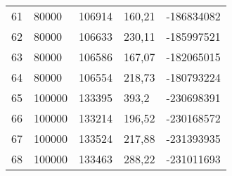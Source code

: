 \begin{longtable}{lllll}
    61               & 80000          & 106914         & 160,21     & -186834082      \\
    62               & 80000          & 106633         & 230,11     & -185997521      \\
    63               & 80000          & 106586         & 167,07     & -182065015      \\
    64               & 80000          & 106554         & 218,73     & -180793224      \\
    65               & 100000         & 133395         & 393,2     & -230698391      \\
    66               & 100000         & 133214         & 196,52     & -230168572      \\
    67               & 100000         & 133524         & 217,88     & -231393935      \\
    68               & 100000         & 133463         & 288,22     & -231011693      
\end{longtable}
